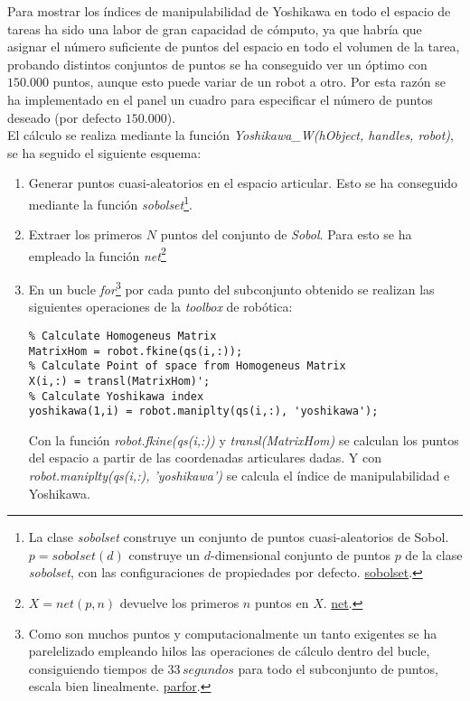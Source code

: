 \documentclass[a4paper, fontsize=11pt]{scrartcl} %
\numberwithin{equation}{section} %
\numberwithin{figure}{section} %
\numberwithin{table}{section} %
\begin{document}
	Para mostrar los índices de manipulabilidad de Yoshikawa en todo el espacio de tareas ha sido una labor de gran capacidad de cómputo, ya que habría que asignar el número suficiente de puntos del espacio en todo el volumen de la tarea, probando distintos conjuntos de puntos se ha conseguido ver un óptimo con $150.000$ puntos, aunque esto puede variar de un robot a otro. Por esta razón se ha implementado en el panel un cuadro para especificar el número de puntos deseado (por defecto $150.000$).\\
	
	El cálculo se realiza mediante la función \textit{Yoshikawa\_W(hObject, handles, robot)}, se ha seguido el siguiente esquema:
	
	\begin{enumerate}
		\item Generar puntos cuasi-aleatorios en el espacio articular. Esto se ha conseguido mediante la función \textit{sobolset}\footnote{La clase \textit{sobolset} construye un conjunto de puntos cuasi-aleatorios de Sobol. $p = sobolset(d)$ construye un $d$-dimensional conjunto de puntos $p$ de la clase \textit{sobolset}, con las configuraciones de propiedades por defecto. \href{http://es.mathworks.com/help/stats/sobolset.html}{sobolset}.}.
		
		\item Extraer los primeros $N$ puntos del conjunto de \textit{Sobol}. Para esto se ha empleado la función \textit{net}\footnote{$X = net(p,n)$ devuelve los primeros $n$ puntos en $X$. \href{http://es.mathworks.com/help/stats/qrandset.net.html}{net}.}
		
		\item En un bucle \textit{for}\footnote{Como son muchos puntos y computacionalmente un tanto exigentes se ha parelelizado empleando hilos las operaciones de cálculo dentro del bucle, consiguiendo tiempos de $33\,segundos$ para todo el subconjunto de puntos, escala bien linealmente. \href{http://es.mathworks.com/help/distcomp/parfor.html}{parfor}.} por cada punto del subconjunto obtenido se realizan las siguientes operaciones de la \textit{toolbox} de robótica:
		\begin{lstlisting}
% Calculate Homogeneus Matrix
MatrixHom = robot.fkine(qs(i,:));
% Calculate Point of space from Homogeneus Matrix                      
X(i,:) = transl(MatrixHom)';      
% Calculate Yoshikawa index                          
yoshikawa(1,i) = robot.maniplty(qs(i,:), 'yoshikawa');      
		\end{lstlisting}
		Con la función \textit{robot.fkine(qs(i,:))} y \textit{transl(MatrixHom)} se calculan los puntos del espacio a partir de las coordenadas articulares dadas. Y con \textit{robot.maniplty(qs(i,:), 'yoshikawa')} se calcula el índice de manipulabilidad e Yoshikawa.
	\end{enumerate}
	
\end{document}
